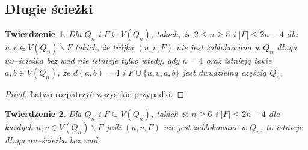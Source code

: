 \documentclass{pracamgr}
\newtheorem{theorem}{Twierdzenie}
\begin{document}
   \subsection{Długie ścieżki}
    \begin{theorem}\label{tw o dlugich sciezkach, male n}
     Dla $Q_n$ i $F\subseteq V(Q_n)$, takich, że $2\le n \ge 5$ i $|F|\le 2n-4$ dla $u,v\in V(Q_n)\backslash F$ takich, że trójka $(u,v,F)$
     nie jest zablokowana  w $Q_n$ długa $uv$--ścieżka bez wad nie istnieje tylko wtedy, gdy $n=4$ oraz istnieją takie $a,b\in V(Q_n)$,
     że $d(a,b)=4$  i $F\cup\{u,v,a,b\}$  jest dwudzielną częścią $Q_n$.
    \end{theorem}
    \begin{proof}%
     Łatwo rozpatrzyć wszystkie przypadki.
    \end{proof}
    \begin{theorem}\label{tw o dlugich sciezkach}
     Dla $Q_n$ i $F\subseteq V(Q_n)$, takich  że  $n\ge 6$ i $|F|\le 2n-4$ dla każdych $u,v\in V(Q_n)\backslash F$ jeśli $(u,v,F)$ nie jest zablokowane w $Q_n$,
     to istnieje długa $uv$--ścieżka bez wad.
    \end{theorem}
\end{document}
